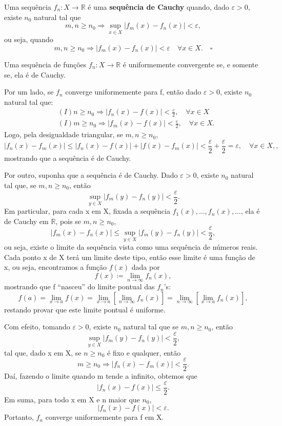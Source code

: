 \documentclass[../analysisII_notes.tex]{subfiles}
\begin{document}
\begin{def*}
	Uma sequência \(f_{n}:X\rightarrow \mathbb{R}\) é uma \textbf{sequência de Cauchy} quando, dado \(\varepsilon >0\), existe \(n_{0}\) natural tal que
	\[
		m, n \geq n_{0} \Rightarrow \sup_{x\in X}|f_{m}(x) - f_{n}(x)| < \varepsilon,
	\]
	ou seja, quando
	\[
		m, n \geq n_{0} \Rightarrow |f_{m}(x) - f_{n}(x)| < \varepsilon \quad \forall x\in X. \quad \square
	\]
\end{def*}
\begin{theorem*}
	Uma sequência de funções \(f_{n}:X\rightarrow \mathbb{R}\) é uniformemente convergente se, e somente se, ela é de Cauchy.
\end{theorem*}
\begin{proof*}
	Por um lado, se \(f_{n}\) converge uniformemente para f, então dado \(\varepsilon  > 0\), existe \(n_{0}\) natural tal que:
	\begin{align*}
		 & (I) n\geq n_{0} \Rightarrow |f_{n}(x) - f(x)| < \frac{\varepsilon }{2},\quad \forall x\in X  \\
		 & (I) m\geq n_{0} \Rightarrow |f_{m}(x) - f(x)| < \frac{\varepsilon }{2},\quad \forall x\in X.
	\end{align*}
	Logo, pela desigualdade triangular, se \(m,n\geq n_{0}\),
	\[
		|f_{n}(x) - f_{m}(x)| \leq |f_{n}(x)-f(x)| + |f(x)-f_{m}(x)| <\frac{\varepsilon }{2} + \frac{\varepsilon }{2} = \varepsilon , \quad \forall x\in X,,
	\]
	mostrando que a sequência é de Cauchy.

	Por outro, suponha que a sequência é de Cauchy. Dado \(\varepsilon  > 0\), existe \(n_{0}\) natural tal que, se \(m, n\geq n_{0}\), então
	\[
		\sup_{y\in X}|f_{m}(y)-f_{n}(y)| < \frac{\varepsilon }{2}.
	\]
	Em particular, para cada x em X, fixada a sequência \(f_1(x),\dotsc, f_{n}(x), \dotsc \), ela é de Cauchy em \(\mathbb{R}\), pois se \(m, n\geq n_{0}\),
	\[
		|f_{m}(x)-f_{n}(x)| \leq \sup_{y\in X}|f_{m}(y) - f_{n}(y)| < \frac{\varepsilon }{2},
	\]
	ou seja, existe o limite da sequência vista como uma sequência de números reais. Cada ponto x de X terá um limite deste tipo, então esse limite é uma função de x, ou seja, encontramos a função \(f(x)\) dada por
	\[
		f(x)\coloneqq \lim_{n\to \infty}f_{n}(x),
	\]
	mostrando que f ``nasceu'' do limite pontual das \(f_{n}\)'s:
	\[
		f(a)=\lim_{x\to a}f(x)=\lim_{x\to a}[\lim_{n\to \infty}f_{n}(x)] = \lim_{n\to \infty}[\lim_{x\to a}f_{n}(x)],
	\]
	restando provar que este limite pontual é uniforme.

	Com efeito, tomando \(\varepsilon > 0\), existe \(n_{0}\) natural tal que se \(m, n\geq n_{0}\), então
	\[
		\sup_{y\in X}|f_{m}(y)-f_{n}(y)|<\frac{\varepsilon }{2},
	\]
	tal que, dado x em X, se \(n\geq n_{0}\) é fixo e qualquer, então
	\[
		m\geq n_{0} \Rightarrow |f_{n}(x)-f_{m}(x)|<\frac{\varepsilon }{2}.
	\]
	Daí, fazendo o limite quando m tende a infinito, obtemos que
	\[
		|f_{n}(x) - f(x)|\leq \frac{\varepsilon }{2}.
	\]
	Em suma, para todo x em X e n maior que \(n_{0}\),
	\[
		|f_{n}(x)-f(x)|<\varepsilon .
	\]
	Portanto, \(f_{n}\) converge uniformemente para f em X. \qedsymbol
\end{proof*}
\end{document}
